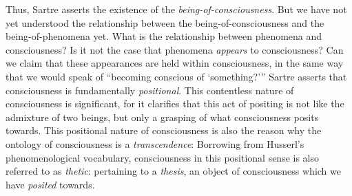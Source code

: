 Thus, Sartre asserts the existence of the \emph{being-of-consciousness}. But we have not yet understood the relationship between the being-of-consciousness and the being-of-phenomena yet. What is the relationship between phenomena and consciousness? Is it not the case that phenomena \emph{appears} to consciousness? Can we claim that these appearances are held within consciousness, in the same way that we would speak of \enquote{becoming conscious of \enquote{something?}} Sartre asserts that consciousness is fundamentally \emph{positional}.  
This contentless nature of consciousness is significant, for it clarifies that this act of positing is not like the admixture of two beings, but only a grasping of what consciousness posits towards.
 This positional nature of consciousness is also the reason why the ontology of consciousness is a \emph{transcendence}:  Borrowing from Husserl's phenomenological vocabulary, consciousness in this positional sense is also referred to as \emph{thetic}: pertaining to a \emph{thesis}, an object of consciousness which we have \emph{posited} towards.


